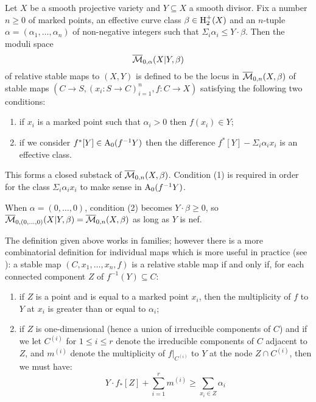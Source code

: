 \begin{definition}[{\cite[Definition 1.1]{Ga}}] Let $X$ be a smooth projective variety and $Y \subseteq X$ a smooth divisor. Fix a number $n \geq 0$ of marked points, an effective curve class $\beta \in \operatorname{H}_2^+(X)$ and an $n$-tuple $\alpha = (\alpha_1, \ldots, \alpha_n)$ of non-negative integers such that $\Sigma_i \alpha_i \leq Y \cdot \beta$. Then the moduli space
\begin{equation*} \overline{\mathcal M}_{0,\alpha}(X|Y,\beta) \end{equation*}
of relative stable maps to $(X,Y)$ is defined to be the locus in $\overline{\mathcal M}_{0,n}(X,\beta)$ of stable maps $(C \to S , (x_i : S \to C)_{i=1}^n , f : C \to X)$ satisfying the following two conditions:
\begin{enumerate}
\item if $x_i$ is a marked point such that $\alpha_i > 0$ then $f(x_i) \in Y$;
\item if we consider $f^* [Y] \in \operatorname{A}_0(f^{-1}Y)$ then the difference $f^* [Y] - \Sigma_i \alpha_i x_i$ is an effective class.
\end{enumerate}
This forms a closed substack of $\overline{\mathcal M}_{0,n}(X,\beta)$. Condition (1) is required in order for the class $\Sigma_i \alpha_i x_i$ to make sense in $\operatorname{A}_0(f^{-1}Y)$.
\end{definition}

\begin{remark} When $\alpha = (0, \ldots, 0)$, condition (2) becomes $Y \cdot \beta \geq 0$, so $\overline{\mathcal M}_{0,(0,\ldots,0)}(X|Y,\beta) = \overline{\mathcal M}_{0,n}(X,\beta)$ as long as $Y$ is nef.\end{remark}

\begin{remark} The definition given above works in families; however there is a more combinatorial definition for individual maps which is more useful in practice (see \cite[Remark 1.4]{Ga}): a stable map $(C,x_1, \ldots, x_n,f)$ is a relative stable map if and only if, for each connected component $Z$ of $f^{-1}(Y) \subseteq C$:
\begin{enumerate}
\item if $Z$ is a point and is equal to a marked point $x_i$, then the multiplicity of $f$ to $Y$ at $x_i$ is greater than or equal to $\alpha_i$;
\item if $Z$ is one-dimensional (hence a union of irreducible components of $C$) and if we let $C^{(i)}$ for $1 \leq i \leq r$ denote the irreducible components of $C$ adjacent to $Z$, and $m^{(i)}$ denote the multiplicity of $f|_{C^{(i)}}$ to $Y$ at the node $Z \cap C^{(i)}$, then we must have:
\begin{equation} \label{Relative stable map internal component inequality} Y \cdot f_* [Z] + \sum_{i=1}^r m^{(i)} \geq \sum_{x_i \in Z} \alpha_i \end{equation}
\end{enumerate} \end{remark}

